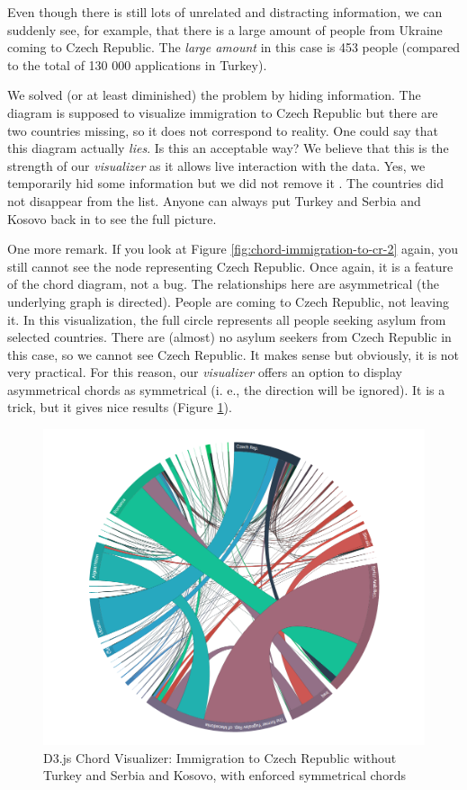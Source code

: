 Even though there is still lots of unrelated and distracting information, we can suddenly see, for example, that there is a large amount of people from Ukraine coming to Czech Republic. The \emph{large amount} in this case is 453 people (compared to the total of 130 000 applications in Turkey).

We solved (or at least diminished) the problem by hiding information. The diagram is supposed to visualize immigration to Czech Republic but there are two countries missing, so it does not correspond to reality. One could say that this diagram actually \emph{lies}. Is this an acceptable way? We believe that this is the strength of our \emph{visualizer} as it allows live interaction with the data. Yes, we temporarily hid some information but we did not remove it . The countries did not disappear from the list. Anyone can always put Turkey and Serbia and Kosovo back in to see the full picture.

One more remark. If you look at Figure \ref{fig:chord-immigration-to-cr-2} again, you still cannot see the node representing Czech Republic. Once again, it is a feature of the chord diagram, not a bug. The relationships here are asymmetrical (the underlying graph is directed). People are coming to Czech Republic, not leaving it. In this visualization, the full circle represents all people seeking asylum from selected countries. There are (almost) no asylum seekers from Czech Republic in this case, so we cannot see Czech Republic. It makes sense but obviously, it is not very practical. For this reason, our \emph{visualizer} offers an option to display asymmetrical chords as symmetrical (i. e., the direction will be ignored). It is a trick, but it gives nice results (Figure \ref{fig:chord-immigration-to-cr-3}).

\begin{figure}
	\centering
	\includegraphics[width=145mm]{img/06_chord_immigration_to_cr_3}
	\caption{D3.js Chord Visualizer: Immigration to Czech Republic without Turkey and Serbia and Kosovo, with enforced symmetrical chords}
    \label{fig:chord-immigration-to-cr-3}
\end{figure}

